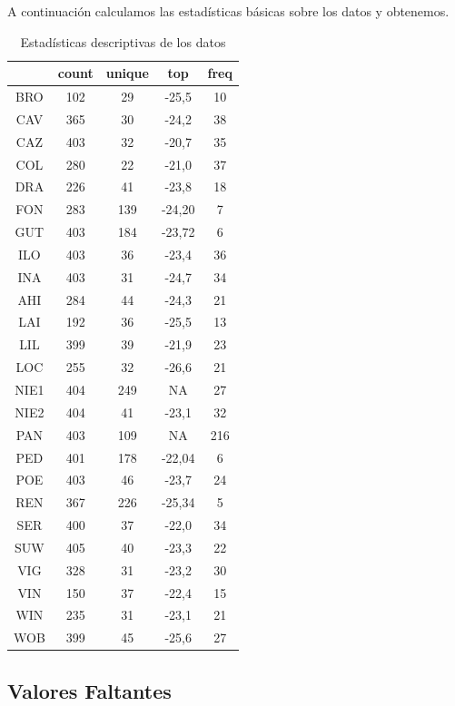 \documentclass[a4paper,11pt]{article}
\begin{document}
A continuación calculamos las estadísticas básicas sobre los datos y obtenemos.

\begin{table}[ht]
	\centering
	\caption{Estadísticas descriptivas de los datos}
	\label{tab:estadisticas_basicas}
	\begin{tabular}{|c|c|c|c|c|}
		\hline
		& count & unique & top & freq \\
		\hline
		BRO & 102 & 29 & -25,5 & 10 \\
		CAV  & 365 & 30 & -24,2 & 38 \\
		CAZ  & 403 & 32 & -20,7 & 35 \\
		COL    & 280 & 22 & -21,0 & 37 \\
		DRA  & 226 & 41 & -23,8 & 18 \\
		FON  & 283 & 139 & -24,20 & 7 \\
		GUT  & 403 & 184 & -23,72 & 6 \\
		ILO & 403 & 36 & -23,4 & 36 \\
		INA  & 403 & 31 & -24,7 & 34 \\
		AHI & 284 & 44 & -24,3 & 21 \\
		LAI  & 192 & 36 & -25,5 & 13 \\
		LIL & 399 & 39 & -21,9 & 23 \\
		LOC  & 255 & 32 & -26,6 & 21 \\
		NIE1 & 404 & 249 & NA  & 27 \\
		NIE2 & 404 & 41 & -23,1 & 32 \\
		PAN  & 403 & 109 & NA  & 216 \\
		PED  & 401 & 178 & -22,04 & 6 \\
		POE  & 403 & 46 & -23,7 & 24 \\
		REN  & 367 & 226 & -25,34 & 5 \\
		SER & 400 & 37 & -22,0 & 34 \\
		SUW  & 405 & 40 & -23,3 & 22 \\
		VIG  & 328 & 31 & -23,2 & 30 \\
		VIN  & 150 & 37 & -22,4 & 15 \\
		WIN & 235 & 31 & -23,1 & 21 \\
		WOB  & 399 & 45 & -25,6 & 27 \\
		\hline
	\end{tabular}
\end{table}


\newpage

\subsection*{Valores Faltantes}
\end{document}
